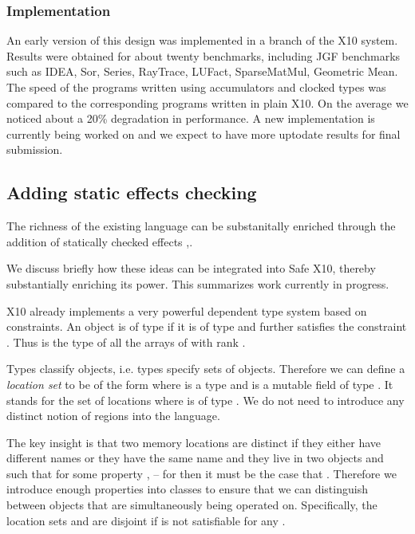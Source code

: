 
\subsubsection{Implementation}
An early version of this design was implemented in a branch of the X10
system. Results were obtained for about twenty benchmarks, including
JGF benchmarks such as IDEA, Sor, Series, RayTrace, LUFact,
SparseMatMul, Geometric Mean.  The speed of the programs written using
accumulators and clocked types was compared to the corresponding
programs written in plain X10. On the average we noticed about a 20\%
degradation in performance. A new implementation is currently being
worked on and we expect to have more uptodate results for final submission.

\subsection{Adding static effects checking}

The richness of the existing language can be substanitally enriched
through the addition of statically checked effects
\cite{Gifford:1986:IFI:319838.319848},\cite{DPJ}. 

We discuss briefly how these ideas can be integrated into Safe X10,
thereby substantially enriching its power. This summarizes work
currently in progress.

X10 already implements a very powerful dependent type system based on
constraints. An object  is of type  if it is of
type  and further satisfies the constraint
. Thus  is the type of all
the arrays of  with rank . 

Types classify objects, i.e.{} types specify sets of
objects. Therefore we can define a {\em location set} to be of the form
 where  is a type and  is a mutable field of
type . It stands for the set of locations  where
 is of type . We do not need to introduce any distinct
notion of regions into the language.

The key insight is that two memory locations are distinct if they
either have different names or they have the same name  and
they live in two objects  and such that for some
property ,  -- for then it must be the case
that . Therefore we introduce enough properties into
classes to ensure that we can distinguish between objects that are
simultaneously being operated on. Specifically, the location sets
 and  are disjoint if
 is not satisfiable for any .


